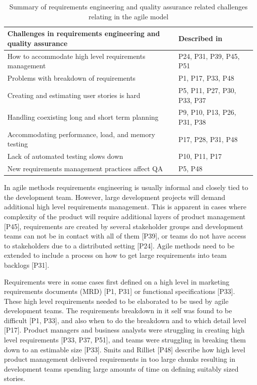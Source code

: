\documentclass[preprint,authoryear,12pt]{elsarticle}
\begin{document}
\begin{table}[t]
    \centering
    \begin{tabular}{ >{\raggedright\arraybackslash}p{}
                     >{\raggedright\arraybackslash}p{} }
        \toprule
        Challenges in requirements engineering and quality assurance  &  Described in \\
        \midrule
        How to accommodate high level requirements management  &  P24, P31, P39, P45, P51  \\
        Problems with breakdown of requirements        &  P1, P17, P33, P48  \\
        Creating and estimating user stories is hard   &  P5, P11, P27, P30, P33, P37 \\
        Handling coexisting long and short term planning  &  P9, P10, P13, P26, P31, P38 \\
        Accommodating performance, load, and memory testing  &  P17, P28, P31, P48 \\
        Lack of automated testing slows down           &  P10, P11, P17 \\
        New requirements management practices affect QA  &  P5, P48 \\
        \bottomrule
    \end{tabular}
    \caption{Summary of requirements engineering and quality assurance related
             challenges relating in the agile model}
    \label{table:challenges_requirementsandqa}
\end{table}


In agile methods requirements engineering is usually informal and closely tied
to the development team. However, large development projects will demand
additional high level requirements management. This is apparent in cases where
complexity of the product will require additional layers of product management
[P45], requirements are created by several stakeholder groups and development
teams can not be in contact with all of them [P39], or teams do not have access
to stakeholders due to a distributed setting [P24]. Agile methods need to be
extended to include a process on how to get large requirements into team
backlogs [P31].

Requirements were in some cases first defined on a high level in marketing
requirements documents (MRD) [P1, P31] or functional specifications [P33].
These high level requirements needed to be elaborated to be used by agile
development teams. The requirements breakdown in it self was found to be
difficult [P1, P33], and also when to do the breakdown and to which detail level
[P17].
Product managers and business analysts were struggling in creating high level
requirements [P33, P37, P51], and teams were struggling in breaking them down to an
estimable size [P33]. Smits and Rilliet [P48] describe how high level product
management delivered requirements in too large chunks resulting in development
teams spending large amounts of time on defining suitably sized stories.
\end{document}
